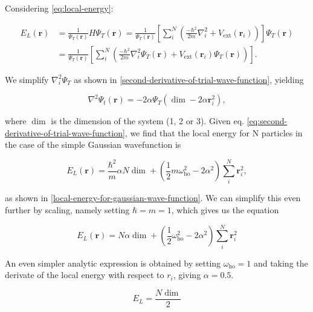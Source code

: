 \documentclass[
]{article}
\begin{document}
Considering \eqref{eq:local-energy}:

\begin{align*}
E_L(\mathbf{r}) &=  \frac{1}{\Psi_T (\mathbf{r})} H \Psi_T (\mathbf{r})
= \frac{1}{\Psi_T (\mathbf{r})} \left[ \sum_i^N \left( \frac{-\hbar^2}{2m}
   \nabla_{i}^2 + V_{\text{ext}}({\mathbf{r}}_i)\right)  \right]\Psi_T(\mathbf{r}) \\
&= \frac{1}{\Psi_T(\mathbf{r})} \left[ \sum_i^N \left (\frac{-\hbar^2}{2m}
  \nabla_{i}^2 \Psi_T (\mathbf{r}) + V_\text{ext} ({\mathbf{r}}_i) \Psi_T(\mathbf{r}) \right) \right].
\end{align*}

We simplify \(\nabla_i^2\Psi_T\) as shown in
\ref{second-derivative-of-trial-wave-function}, yielding

\begin{equation}\nabla^2\Psi_t(\mathbf r) = -2\alpha\Psi_T\left(\dim - 2\alpha\mathbf r_i^2\right),\label{eq:second-derivative-of-trial-wave-function}\end{equation}

where \(\dim\) is the dimension of the system (1, 2 or 3). Given eq.
\eqref{eq:second-derivative-of-trial-wave-function}, we find that the
local energy for N particles in the case of the simple Gaussian
wavefunction is

\begin{equation} E_L(\mathbf{r}) = \frac{\hbar^2 }{m} \alpha N \dim +  \left( \frac{1}{2} m \omega^2_\text{ho} - 2 \alpha^2\right)  \sum_i^N \mathbf{r}^2_{i},\label{eq:local-energy-gauss}\end{equation}

as shown in \ref{local-energy-for-gaussian-wave-function}. We can
simplify this even further by scaling, namely setting \(\hbar = m = 1\),
which gives us the equation

\begin{equation}E_L(\mathbf{r}) = N\alpha  \dim  + \left(\frac{1}{2} \omega^2_\text{ho} - 2 \alpha^2\right) \sum_i^N \mathbf{r}^2_{i}\label{eq:local-energy-gauss-scaled}\end{equation}

An even simpler analytic expression is obtained by setting
\(\omega_{\text{ho}} = 1\) and taking the derivate of the local energy
with respect to \(r_i\), giving \(\alpha= 0.5\).

\begin{equation}E_L = \frac{N \dim}{2}\label{eq:local-energy-min}\end{equation}
\end{document}
